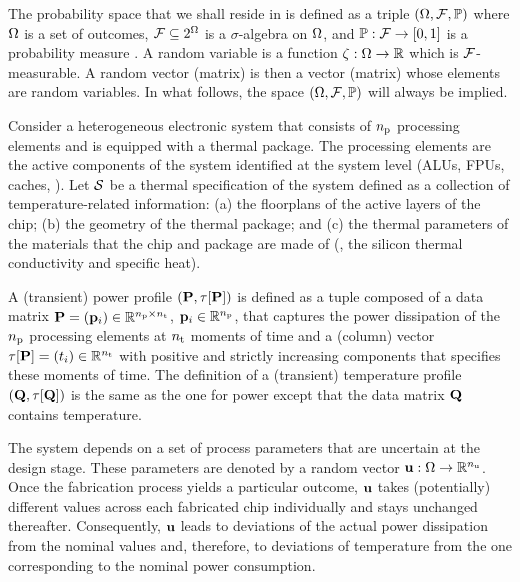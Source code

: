 
The probability space that we shall reside in is defined as a triple $(\Omega, \mathcal{F}, \mathbb{P})$ where $\Omega$ is a set of outcomes, $\mathcal{F} \subseteq 2^\Omega$ is a $\sigma$-algebra on $\Omega$, and $\mathbb{P}: \mathcal{F} \to [0, 1]$ is a probability measure \cite{xiu2010}.
A random variable is a function $\zeta: \Omega \to \mathbb{R}$ which is $\mathcal{F}$-measurable.
A random vector (matrix) is then a vector (matrix) whose elements are random variables.
In what follows, the space $(\Omega, \mathcal{F}, \mathbb{P})$ will always be implied.

Consider a heterogeneous electronic system that consists of ${n_\text{p}}$ processing elements and is equipped with a thermal package.
The processing elements are the active components of the system identified at the system level (ALUs, FPUs, caches, \etc).
Let $\mathcal{S}$ be a thermal specification of the system defined as a collection of temperature-related information: (a) the floorplans of the active layers of the chip; (b) the geometry of the thermal package; and (c) the thermal parameters of the materials that the chip and package are made of (\eg, the silicon thermal conductivity and specific heat).

A (transient) power profile $\profileP$ is defined as a tuple composed of a data matrix $\mP = (\vP_i) \in \real^{\nprocs \times \nsteps}$, $\mathbf{p}_i \in \mathbb{R}^{n_\text{p}}$, that captures the power dissipation of the ${n_\text{p}}$ processing elements at ${n_\text{t}}$ moments of time and a (column) vector $\partition{\mP} = (\t_i) \in \real^{\nsteps}$ with positive and strictly increasing components that specifies these moments of time.
The definition of a (transient) temperature profile $\profileT$ is the same as the one for power except that the data matrix $\mTO$ contains temperature.

The system depends on a set of process parameters that are uncertain at the design stage.
These parameters are denoted by a random vector $\mathbf{u}: \Omega \to \mathbb{R}^{n_\text{u}}$.
Once the fabrication process yields a particular outcome, $\mathbf{u}$ takes (potentially) different values across each fabricated chip individually and stays unchanged thereafter.
Consequently, $\mathbf{u}$ leads to deviations of the actual power dissipation from the nominal values and, therefore, to deviations of temperature from the one corresponding to the nominal power consumption.

